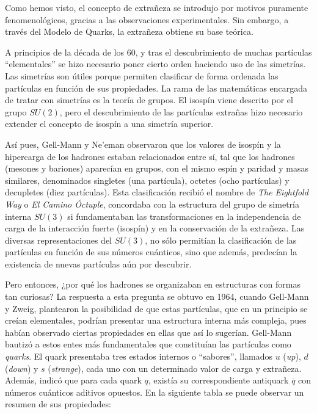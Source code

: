 Como hemos visto, el concepto de extrañeza se introdujo por motivos puramente fenomenológicos, gracias a las observaciones experimentales. Sin embargo, a través del Modelo de Quarks, la extrañeza obtiene su base teórica.

A principios de la década de los 60, y tras el descubrimiento de muchas partículas ``elementales'' se hizo necesario poner cierto orden haciendo uso de las simetrías. Las simetrías son útiles porque permiten clasificar de forma ordenada las partículas en función de sus propiedades. La rama de las matemáticas encargada de tratar con simetrías es la teoría de grupos. El isospín viene descrito por el grupo $SU(2)$, pero el descubrimiento de las partículas extrañas hizo necesario extender el concepto de isospín a una simetría superior.

Así pues, Gell-Mann y Ne'eman observaron que los valores de isospín y la hipercarga de los hadrones estaban relacionados entre sí, tal que los hadrones (mesones y bariones) aparecían en grupos, con el mismo espín y paridad y masas similares, denominados singletes (una partícula), octetes (ocho partículas) y decupletes (diez partículas).  Esta clasificación recibió el nombre de \textit{The Eightfold Way} o \textit{El Camino Óctuple}, concordaba con la estructura del grupo de simetría interna $SU(3)$ si fundamentaban las transformaciones en la independencia de carga de la interacción fuerte (isospín) y en la conservación de la extrañeza.\cite{notas2020} Las diversas representaciones del $SU(3)$, no sólo permitían la clasificación de las partículas en función de sus números cuánticos, sino que además, predecían la existencia de nuevas partículas aún por descubrir. 

Pero entonces, ¿por qué los hadrones se organizaban en estructuras con formas tan curiosas? La respuesta a esta pregunta se obtuvo en 1964, cuando Gell-Mann y Zweig, plantearon la posibilidad de que estas partículas, que en un principio se creían elementales, podrían presentar una estructura interna más compleja, pues habían observado ciertas propiedades en ellas que así lo sugerían. Gell-Mann bautizó a estos entes más fundamentales que constituían las partículas como \textit{quarks}.\cite{Griffiths2008} El quark presentaba tres estados internos o ``sabores'', llamados $u$ (\textit{up}), $d$ (\textit{down}) y $s$ (\textit{strange}), cada uno con un determinado valor de carga y extrañeza. Además, indicó que para cada quark $q$, existía su correspondiente antiquark $\overline{q}$ con números cuánticos aditivos opuestos. En la siguiente tabla se puede observar un resumen de sus propiedades:


